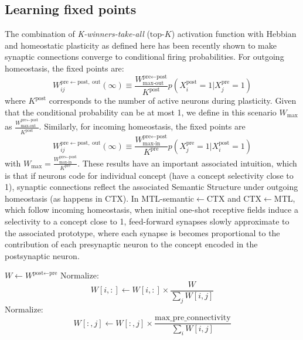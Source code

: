 \documentclass{article}
\begin{document}
\subsection*{Learning fixed points}
The combination of \textit{K-winners-take-all} ($\textrm{top-}K$) activation function with Hebbian and homeostatic plasticity as defined here has been recently shown  to make synaptic connections converge to conditional firing probabilities. For outgoing homeostasis, the fixed points are:
  \begin{equation}
     W_{ij}^{\textrm{pre}\leftarrow\textrm{post}, \; \textrm{out}}(\infty) \equiv \frac{W_\textrm{max-out}^{\textrm{pre}\leftarrow\textrm{post}}}{K^\textrm{post}}p(X^\textrm{post}_i = 1| X^\textrm{pre}_j = 1)
 \end{equation}
 where $K^\textrm{post}$ corresponds to the number of active neurons during plasticity. Given that the conditional probability can be at most 1, we define in this scenario $W_\textrm{max}$ as $\frac{W_\textrm{max-out}^{\textrm{pre}\leftarrow\textrm{post}}}{K^\textrm{post}}$. Similarly, for incoming homeostasis, the fixed points are
   \begin{equation}
   W_{ij}^{\textrm{pre}\leftarrow\textrm{post}, \; \textrm{out}}(\infty) \equiv \frac{W_\textrm{max-in}^{\textrm{pre}\leftarrow\textrm{post}}}{K^\textrm{pre}}p(X^\textrm{pre}_j = 1| X^\textrm{post}_i = 1)
 \end{equation}
 with $W_\textrm{max}=\frac{W_\textrm{max-in}^{\textrm{pre}\leftarrow\textrm{post}}}{K^\textrm{pre}}$. These results have an important associated intuition, which is that if neurons code for individual concept (have a concept selectivity close to 1), synaptic connections reflect the associated Semantic Structure  under outgoing homeostasis (as happens in CTX). In MTL-semantic$\leftarrow$CTX and CTX$\leftarrow$MTL, which follow incoming homeostasis, when initial one-shot receptive fields induce a selectivity to a concept close to 1, feed-forward synapses slowly approximate to the associated prototype, where each synapse is becomes proportional to the contribution of each presynaptic neuron to the concept encoded in the postsynaptic neuron.
\begin{algorithm}
\caption{Homeostasis}\label{alg:homeostasis}
\begin{algorithmic}[1]
\State $W \gets W^{\textrm{post}\leftarrow\textrm{pre}}$
            \State Normalize:
                \[
                W[i,:] \gets W[i,:] 
                \times
                \frac{W^\textrm{}}{\sum_j W[i,j]}
                \]
        \EndIf
    \EndFor
            \State Normalize:
                \[
                W[:,j] \gets W[:,j] 
                \times
                \frac{\text{max\_pre\_connectivity}}{\sum_i W[i,j]}
                \]
        \EndIf
    \EndFor
\EndFunction
\end{algorithmic}
\end{algorithm}
\end{document}
